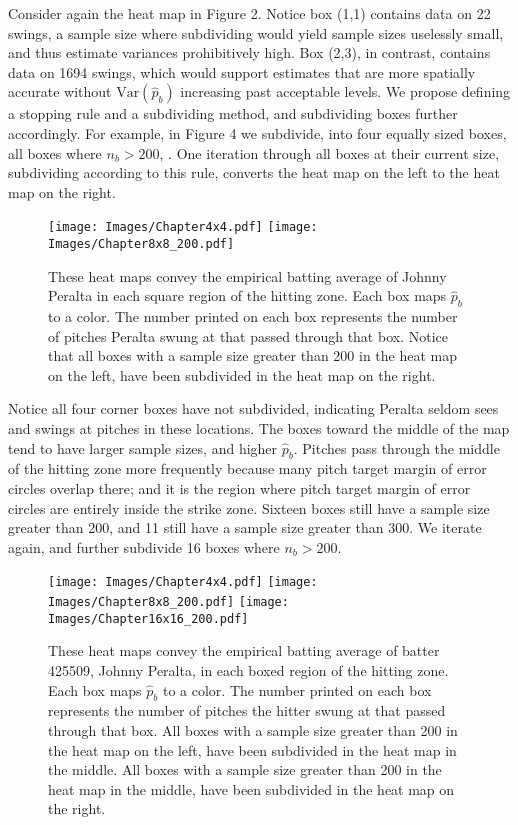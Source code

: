 \documentclass{article}
\begin{document}
Consider again the heat map in Figure 2. Notice box (1,1) contains data on 22 swings, a sample size where subdividing would yield sample sizes uselessly small, and thus estimate variances prohibitively high. Box (2,3), in contrast, contains data on 1694 swings, which would support estimates that are more spatially accurate without $\text{Var}(\hat{p}_{b})$ increasing past acceptable levels. We propose defining a stopping rule and a subdividing method, and subdividing boxes further accordingly. For example, in Figure 4 we subdivide, into four equally sized boxes, all boxes where $n_{b} > 200$, . One iteration through all boxes at their current size, subdividing according to this rule, converts the heat map on the left to the heat map on the right.
        \begin{figure}[H]
      	\centering
      	\texttt{[image: Images/Chapter4x4.pdf]} 
      	\texttt{[image: Images/Chapter8x8\_200.pdf]} 
      	\caption{These heat maps convey the empirical batting average of Johnny Peralta in each square region of the hitting zone. Each box maps $\hat{p}_{b}$ to a color. The number printed on each box represents the number of pitches Peralta swung at that passed through that box. Notice that all boxes with a sample size greater than 200 in the heat map on the left, have been subdivided in the heat map on the right.}
      	\end{figure} 
Notice all four corner boxes have not subdivided, indicating Peralta seldom sees and swings at pitches in these locations. The boxes toward the middle of the map tend to have larger sample sizes, and higher $\hat{p}_{b}$. Pitches pass through the middle of the hitting zone more frequently because many pitch target margin of error circles overlap there; and it is the region where pitch target margin of error circles are entirely inside the strike zone. Sixteen boxes still have a sample size greater than 200, and 11 still have a sample size greater than 300. We iterate again, and further subdivide 16 boxes where $n_{b} > 200$.
        \begin{figure}[H]
      	\centering
      	
      	\texttt{[image: Images/Chapter4x4.pdf]}
      	\texttt{[image: Images/Chapter8x8\_200.pdf]} 
      	\texttt{[image: Images/Chapter16x16\_200.pdf]} 
      	\caption{These heat maps convey the empirical batting average of batter 425509, Johnny Peralta, in each boxed region of the hitting zone. Each box maps $\hat{p}_{b}$ to a color. The number printed on each box represents the number of pitches the hitter swung at that passed through that box. All boxes with a sample size greater than 200 in the heat map on the left, have been subdivided in the heat map in the middle. All boxes with a sample size greater than 200 in the heat map in the middle, have been subdivided in the heat map on the right.}
      	\end{figure}
\end{document}
